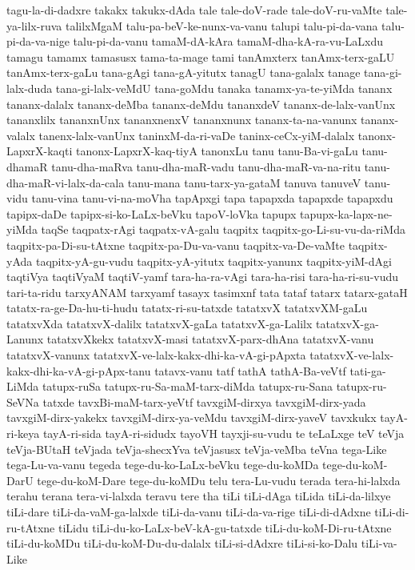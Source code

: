 {tagu-la-di-dadxre
takakx
takukx-dAda
tale
tale-doV-rade
tale-doV-ru-vaMte
tale-ya-lilx-ruva
talilxMgaM
talu-pa-beV-ke-nunx-va-vanu
talupi
talu-pi-da-vana
talu-pi-da-va-nige
talu-pi-da-vanu
tamaM-dA-kAra
tamaM-dha-kA-ra-vu-LaLxdu
tamagu
tamamx
tamasusx
tama-ta-mage
tami
tanAmxterx
tanAmx-terx-gaLU
tanAmx-terx-gaLu
tana-gAgi
tana-gA-yitutx
tanagU
tana-galalx
tanage
tana-gi-lalx-duda
tana-gi-lalx-veMdU
tana-goMdu
tanaka
tanamx-ya-te-yiMda
tananx
tananx-dalalx
tananx-deMba
tananx-deMdu
tananxdeV
tananx-de-lalx-vanUnx
tananxlilx
tananxnUnx
tananxnenxV
tananxnunx
tananx-ta-na-vanunx
tananx-valalx
tanenx-lalx-vanUnx
taninxM-da-ri-vaDe
taninx-ceCx-yiM-dalalx
tanonx-LapxrX-kaqti
tanonx-LapxrX-kaq-tiyA
tanonxLu
tanu
tanu-Ba-vi-gaLu
tanu-dhamaR
tanu-dha-maRva
tanu-dha-maR-vadu
tanu-dha-maR-va-na-ritu
tanu-dha-maR-vi-lalx-da-cala
tanu-mana
tanu-tarx-ya-gataM
tanuva
tanuveV
tanu-vidu
tanu-vina
tanu-vi-na-moVha
tapApxgi
tapa
tapapxda
tapapxde
tapapxdu
tapipx-daDe
tapipx-si-ko-LaLx-beVku
tapoV-loVka
tapupx
tapupx-ka-lapx-ne-yiMda
taqSe
taqpatx-rAgi
taqpatx-vA-galu
taqpitx
taqpitx-go-Li-su-vu-da-riMda
taqpitx-pa-Di-su-tAtxne
taqpitx-pa-Du-va-vanu
taqpitx-va-De-vaMte
taqpitx-yAda
taqpitx-yA-gu-vudu
taqpitx-yA-yitutx
taqpitx-yanunx
taqpitx-yiM-dAgi
taqtiVya
taqtiVyaM
taqtiV-yamf
tara-ha-ra-vAgi
tara-ha-risi
tara-ha-ri-su-vudu
tari-ta-ridu
tarxyANAM
tarxyamf
tasayx
tasimxnf
tata
tataf
tatarx
tatarx-gataH
tatatx-ra-ge-Da-hu-ti-hudu
tatatx-ri-su-tatxde
tatatxvX
tatatxvXM-gaLu
tatatxvXda
tatatxvX-dalilx
tatatxvX-gaLa
tatatxvX-ga-Lalilx
tatatxvX-ga-Lanunx
tatatxvXkekx
tatatxvX-masi
tatatxvX-parx-dhAna
tatatxvX-vanu
tatatxvX-vanunx
tatatxvX-ve-lalx-kakx-dhi-ka-vA-gi-pApxta
tatatxvX-ve-lalx-kakx-dhi-ka-vA-gi-pApx-tanu
tatavx-vanu
tatf
tathA
tathA-Ba-veVtf
tati-ga-LiMda
tatupx-ruSa
tatupx-ru-Sa-maM-tarx-diMda
tatupx-ru-Sana
tatupx-ru-SeVNa
tatxde
tavxBi-maM-tarx-yeVtf
tavxgiM-dirxya
tavxgiM-dirx-yada
tavxgiM-dirx-yakekx
tavxgiM-dirx-ya-veMdu
tavxgiM-dirx-yaveV
tavxkukx
tayA-ri-keya
tayA-ri-sida
tayA-ri-sidudx
tayoVH
tayxji-su-vudu
te
teLaLxge
teV
teVja
teVja-BUtaH
teVjada
teVja-shecxYva
teVjasusx
teVja-veMba
teVna
tega-Like
tega-Lu-va-vanu
tegeda
tege-du-ko-LaLx-beVku
tege-du-koMDa
tege-du-koM-DarU
tege-du-koM-Dare
tege-du-koMDu
telu
tera-Lu-vudu
terada
tera-hi-lalxda
terahu
terana
tera-vi-lalxda
teravu
tere
tha
tiLi
tiLi-dAga
tiLida
tiLi-da-lilxye
tiLi-dare
tiLi-da-vaM-ga-lalxde
tiLi-da-vanu
tiLi-da-va-rige
tiLi-di-dAdxne
tiLi-di-ru-tAtxne
tiLidu
tiLi-du-ko-LaLx-beV-kA-gu-tatxde
tiLi-du-koM-Di-ru-tAtxne
tiLi-du-koMDu
tiLi-du-koM-Du-du-dalalx
tiLi-si-dAdxre
tiLi-si-ko-Dalu
tiLi-va-Like
}
